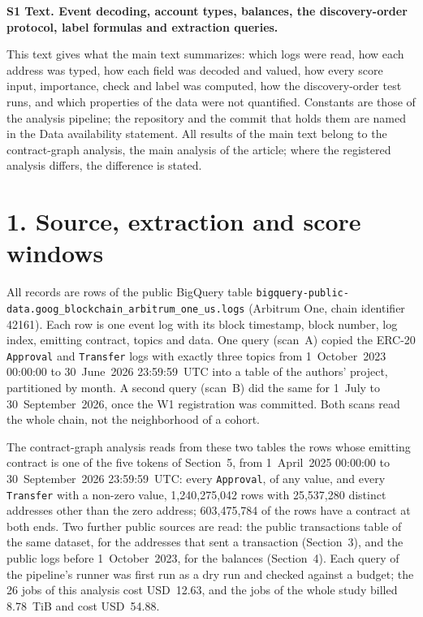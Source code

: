 \documentclass[10pt,letterpaper]{article}
\begin{document}
\raggedright
{\large\textbf{S1 Text. Event decoding, account types, balances, the discovery-order protocol, label formulas and extraction queries.}}

This text gives what the main text summarizes: which logs were read, how each address was typed, how each field was decoded and valued, how every score input, importance, check and label was computed, how the discovery-order test runs, and which properties of the data were not quantified. Constants are those of the analysis pipeline; the repository and the commit that holds them are named in the Data availability statement. All results of the main text belong to the contract-graph analysis, the main analysis of the article; where the registered analysis differs, the difference is stated.

\section*{1. Source, extraction and score windows}
All records are rows of the public BigQuery table \texttt{bigquery-public-data.goog\_blockchain\_arbitrum\_one\_us.logs} (Arbitrum One, chain identifier 42161). Each row is one event log with its block timestamp, block number, log index, emitting contract, topics and data. One query (scan~A) copied the ERC-20 \texttt{Approval} and \texttt{Transfer} logs with exactly three topics from 1~October~2023 00:00:00 to 30~June~2026 23:59:59~UTC into a table of the authors' project, partitioned by month. A second query (scan~B) did the same for 1~July to 30~September~2026, once the W1 registration was committed. Both scans read the whole chain, not the neighborhood of a cohort.

The contract-graph analysis reads from these two tables the rows whose emitting contract is one of the five tokens of Section~5, from 1~April~2025 00:00:00 to 30~September~2026 23:59:59~UTC: every \texttt{Approval}, of any value, and every \texttt{Transfer} with a non-zero value, 1,240,275,042 rows with 25,537,280 distinct addresses other than the zero address; 603,475,784 of the rows have a contract at both ends. Two further public sources are read: the public transactions table of the same dataset, for the addresses that sent a transaction (Section~3), and the public logs before 1~October~2023, for the balances (Section~4). Each query of the pipeline's runner was first run as a dry run and checked against a budget; the 26 jobs of this analysis cost USD~12.63, and the jobs of the whole study billed 8.78~TiB and cost USD~54.88.
\end{document}
